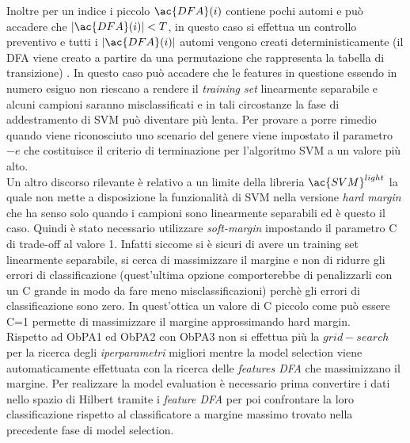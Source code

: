 Inoltre per un indice i piccolo $\ac{DFA}(i)$ contiene pochi automi e può accadere che $|\ac{DFA}(i)|<T$, in questo caso si effettua un controllo preventivo e tutti i  $|\ac{DFA}(i)|$ automi vengono creati deterministicamente (il \ac{DFA} viene creato a partire da una permutazione che rappresenta la tabella di transizione) . In questo caso può accadere che le features in questione essendo in numero esiguo non riescano a rendere il \textit{training set} linearmente separabile e alcuni campioni saranno misclassificati e in tali circostanze la fase di addestramento  di \ac{SVM} può diventare più lenta. Per provare a porre rimedio quando viene riconosciuto uno scenario del genere viene impostato il parametro $-e$  che costituisce il criterio di terminazione per l'algoritmo \ac{SVM} a un valore più alto.\\
Un altro discorso rilevante è relativo a un limite della libreria $\ac{SVM}^{light}$ la quale non mette a disposizione la funzionalità di \ac{SVM} nella versione \textit{hard margin} che ha senso solo quando i campioni sono linearmente separabili ed è questo il caso. Quindi è stato necessario utilizzare \textit{soft-margin} impostando il parametro C di trade-off al valore 1.  Infatti siccome si è sicuri di avere un training set linearmente separabile, si cerca di massimizzare il margine e non di ridurre gli errori di classificazione (quest'ultima opzione comporterebbe di penalizzarli con un C grande in modo da fare meno misclassificazioni) perchè gli errori di classificazione sono zero.  In quest'ottica un valore di C piccolo come può essere C=1 permette di massimizzare il margine approssimando hard margin. \\
Rispetto ad \ac{ObPA}1 ed \ac{ObPA}2 con \ac{ObPA}3 non si effettua più la $grid-search$ per la ricerca degli \textit{iperparametri} migliori mentre la model selection viene automaticamente effettuata con la ricerca delle \textit{features \ac{DFA}} che massimizzano il margine. Per realizzare la model evaluation è necessario prima convertire i dati nello spazio di Hilbert tramite i \textit{feature \ac{DFA}} per poi confrontare la loro classificazione rispetto al classificatore a margine massimo trovato nella precedente fase di model selection.




 

